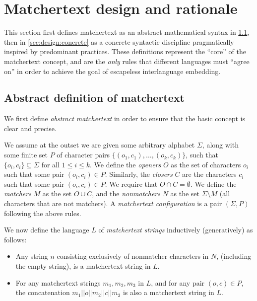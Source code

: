 \section{Matchertext design and rationale}
\label{sec:design}

This section first defines matchertext 
as an abstract mathematical syntax in \cref{sec:design:abstract},
then in \cref{sec:design:concrete}
as a concrete syntactic discipline
pragmatically inspired by predominant practices.
These definitions represent the ``core'' of the matchertext concept,
and are the \emph{only} rules
that different languages must ``agree on''
in order to achieve the goal of escapeless interlanguage embedding.

\subsection{Abstract definition of matchertext}
\label{sec:design:abstract}

We first define \emph{abstract matchertext}
in order to ensure that the basic concept is clear and precise.


We assume at the outset we are given some arbitrary alphabet $\Sigma$,
along with some finite set $P$ of character pairs 
$\{(o_1,c_1),\dots,(o_k,c_k)\}$,
such that $\{o_i, c_i\} \subseteq \Sigma$ for all $1 \le i \le k$.
We define the \emph{openers} $O$ as the set of characters $o_i$
such that some pair $(o_i, c_i) \in P$.
Similarly, the \emph{closers} $C$ are the characters $c_i$
such that some pair $(o_i, c_i) \in P$.
We require that $O \cap C = \emptyset$.
We define the \emph{matchers} $M$ as the set $O \cup C$,
and the \emph{nonmatchers} $N$ as the set $\Sigma \setminus M$
(\ie all characters that are not matchers).
A \emph{matchertext configuration}
is a pair $(\Sigma, P)$ following the above rules.

We now define the language $L$ of \emph{matchertext strings}
inductively (\ie generatively) as follows:
\begin{itemize}
\item	Any string $n$ consisting exclusively of nonmatcher characters in $N$,
	(including the empty string),
	is a matchertext string in $L$.
\item	For any matchertext strings $m_1,m_2,m_3$ in $L$,
	and for any pair $(o,c) \in P$,
	the concatenation $m_1||o||m_2||c||m_3$
	is also a matchertext string in $L$.
\end{itemize}

